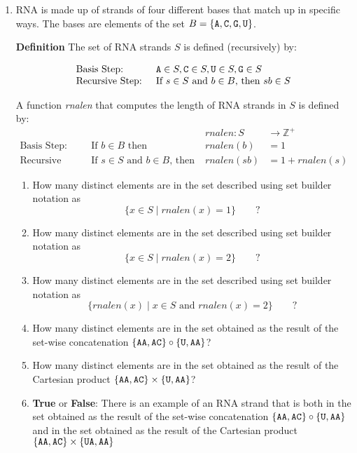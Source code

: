 \documentclass[12pt, oneside]{article}
\begin{document}
\begin{enumerate}
\item RNA is made up of strands of four different bases that match up in
specific ways. The bases are elements of the set 
$B  = \{\texttt{A}, \texttt{C}, \texttt{G}, \texttt{U} \}$.

{\bf Definition} The set of RNA strands $S$ is defined (recursively) by:

\[
\begin{array}{ll}
\textrm{Basis Step: } & \texttt{A} \in S, \texttt{C} \in S, \texttt{U} \in S, \texttt{G} \in S \\
\textrm{Recursive Step: } & \textrm{If } s \in S\textrm{ and }b \in B \textrm{, then }sb \in S
\end{array}
\]

A function \textit{rnalen} that computes the length of RNA strands in $S$ is defined by:
\[
\begin{array}{llll}
& & \textit{rnalen} : S & \to \mathbb{Z}^+ \\
\textrm{Basis Step:} & \textrm{If } b \in B\textrm{ then } & \textit{rnalen}(b) & = 1 \\
\textrm{Recursive Step:} & \textrm{If } s \in S\textrm{ and }b \in B\textrm{, then  } & \textit{rnalen}(sb) & = 1 + \textit{rnalen}(s)
\end{array}
\]

\begin{enumerate}
\item How many distinct elements are in the set described using set builder notation as 
\[
\{ x \in S \mid rnalen(x) = 1\} \qquad ?
\]

\item How many distinct elements are in the set described using set builder notation as 
\[
\{ x \in S \mid rnalen(x) = 2\} \qquad ?
\]

\item How many distinct elements are in the set described using set builder notation as 
\[
\{ rnalen(x) \mid x \in S \text{ and } rnalen(x) = 2\} \qquad ?
\]


\item How many distinct elements are in the set obtained as the result
of the set-wise concatenation $\{ \texttt{A}\texttt{A}, \texttt{A}\texttt{C} \} \circ \{\texttt{U}, \texttt{A}\texttt{A} \}$?

\item How many distinct elements are in the set obtained as the result
of the Cartesian product $\{ \texttt{A}\texttt{A}, \texttt{A}\texttt{C} \} \times \{\texttt{U}, \texttt{A}\texttt{A} \}$?

\item {\bf True} or {\bf False}: There is an example of an RNA strand that is both in the set obtained as the result
of the set-wise concatenation $\{ \texttt{A}\texttt{A}, \texttt{A}\texttt{C} \} \circ \{\texttt{U}, \texttt{A}\texttt{A} \}$ and in the set obtained as the result of the 
Cartesian product $\{ \texttt{A}\texttt{A}, \texttt{A}\texttt{C} \} \times \{\texttt{U}\texttt{A}, \texttt{A}\texttt{A} \}$


\end{enumerate}
\end{enumerate}
\end{document}
